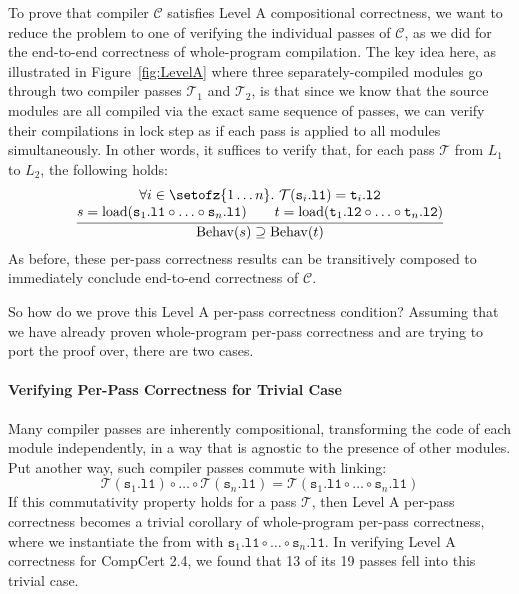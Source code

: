 To prove that compiler $\mathcal{C}$ satisfies Level A compositional correctness, we want to reduce
the problem to one of verifying the individual passes of $\mathcal{C}$, as we did for the end-to-end
correctness of whole-program compilation.  The key idea here, as illustrated in
Figure~\ref{fig:LevelA} where three separately-compiled modules go through two compiler passes
$\mathcal{T}_1$ and $\mathcal{T}_2$, is that since we know that the source modules are all compiled
via the exact same sequence of passes, we can verify their compilations in lock step as if each pass
is applied to all modules simultaneously.  In other words, it suffices to verify that, for each pass
$\mathcal{T}$ from $L_1$ to $L_2$, the following holds:
\[
\frac{
\begin{array}{@{}c@{}}
\forall i\in\setofz{1\ldots n}.~\mathcal{T}(\mathtt{s}_i\mathtt{.l1}) = \mathtt{t}_i\mathtt{.l2} \\
s = \mathrm{load}(\mathtt{s}_1\mathtt{.l1}\circ \ldots \circ \mathtt{s}_n\mathtt{.l1})\qquad
t = \mathrm{load}(\mathtt{t}_1\mathtt{.l2}\circ \ldots \circ \mathtt{t}_n\mathtt{.l2})
\end{array}
}
{
\mathrm{Behav}(s) 
\supseteq \mathrm{Behav}(t)
}
\]
As before, these per-pass correctness results can be transitively
composed to immediately conclude end-to-end correctness of
$\mathcal{C}$.

So how do we prove this Level A per-pass correctness condition?  Assuming that we have already
proven whole-program per-pass correctness and are trying to port the proof over, there are two
cases.

\paragraph{Verifying Per-Pass Correctness for Trivial Case}

Many compiler passes are inherently
compositional, transforming the code of each module independently, \ie
in a way that is agnostic to the presence of other modules.  Put
another way, such compiler passes commute with linking:
\[
\mathcal{T}(\mathtt{s}_1\mathtt{.l1})\circ \ldots \circ \mathcal{T}(\mathtt{s}_n\mathtt{.l1}) = \mathcal{T}(\mathtt{s}_1\mathtt{.l1}\circ \ldots \circ \mathtt{s}_n\mathtt{.l1})
\]
If this commutativity property holds for a pass $\mathcal{T}$, then Level A per-pass correctness
becomes a trivial corollary of whole-program per-pass correctness, where we instantiate the
 from  with
$\mathtt{s}_1\mathtt{.l1}\circ \ldots \circ \mathtt{s}_n\mathtt{.l1}$.  In verifying Level A
correctness for CompCert 2.4, we found that 13 of its 19 passes fell into this trivial case.

